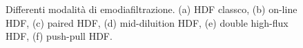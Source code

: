 \begin{figure}[htb]
	\centering
	\qquad
	\\
	\qquad
	\\
		\qquad
	\caption{Differenti modalità di emodiafiltrazione. (a) HDF classco, (b) on-line HDF, (c) paired HDF, (d) mid-diluition HDF, (e) double high-flux HDF, (f) push-pull HDF.}\label{evolution}		
\end{figure}